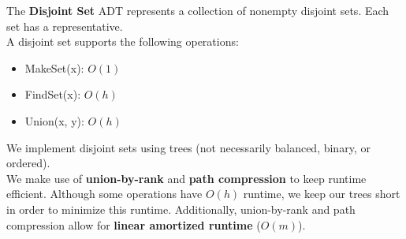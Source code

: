 \documentclass{article}
\begin{document}
\begin{defn}
The \textbf{Disjoint Set} ADT represents a collection of nonempty disjoint sets. Each set has a representative. \\
A disjoint set supports the following operations:
\begin{itemize}
    \item MakeSet(x): $ O(1) $
    \item FindSet(x): $ O(h) $
    \item Union(x, y): $ O(h) $
\end{itemize}
We implement disjoint sets using trees (not necessarily balanced, binary, or ordered). \\
We make use of \textbf{union-by-rank} and \textbf{path compression} to keep runtime efficient.
Although some operations have $ O(h) $ runtime, we keep our trees short in order to minimize this runtime. Additionally, union-by-rank and path compression allow for \textbf{linear amortized runtime} ($ O(m) $).
\end{defn}
\end{document}
